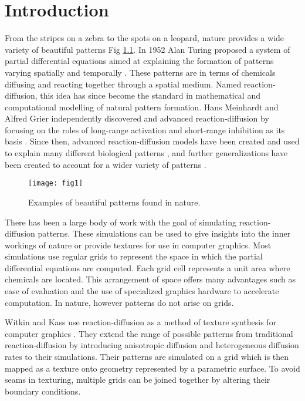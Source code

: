 \chapter{Introduction}
From the stripes on a zebra to the spots on a leopard, nature provides a wide variety of beautiful patterns Fig \ref{fig:naturalPatterns1}. In 1952 Alan Turing proposed a system of partial differential equations aimed at explaining the formation of patterns varying spatially and temporally \cite{Turing1952}. These patterns are in terms of chemicals diffusing and reacting together through a spatial medium. Named reaction-diffusion, this idea has since become the standard in mathematical and computational modelling of natural pattern formation. Hans Meinhardt and Alfred Grier independently discovered and advanced reaction-diffusion by focusing on the roles of long-range activation and short-range inhibition as its basis \cite{Gierer1972}. Since then, advanced reaction-diffusion models have been created and used to explain many different biological patterns \cite{GarzonAlvarado2011, fowler1992modeling, lefevre2010reaction}, and further generalizations have been created to account for a wider variety of patterns \cite{KONDO2017120}.

\begin{figure}[H]
  \centering
  \texttt{[image: fig1]}
  \caption{Examples of beautiful patterns found in nature.}
  \label{fig:naturalPatterns1}
\end{figure}

There has been a large body of work with the goal of simulating reaction-diffusion patterns. These simulations can be used to give insights into the inner workings of nature or provide textures for use in computer graphics. Most simulations use regular grids to represent the space in which the partial differential equations are computed. Each grid cell represents a unit area where chemicals are located. This arrangement of space offers many advantages such as ease of evaluation and the use of specialized graphics hardware to accelerate computation. In nature, however patterns do not arise on grids. 

Witkin and Kass use reaction-diffusion as a method of texture synthesis for computer graphics \cite{Witkin1991}. They extend the range of possible patterns from traditional reaction-diffusion by introducing anisotropic diffusion and heterogeneous diffusion rates to their simulations. Their patterns are simulated on a grid which is then mapped as a texture onto geometry represented by a parametric surface.  To avoid seams in texturing, multiple grids can be joined together by altering their boundary conditions. 

